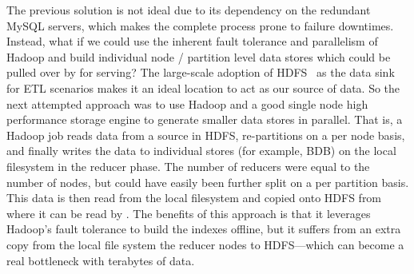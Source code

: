 The previous solution is not ideal due to its dependency on the
redundant MySQL servers, which makes the complete process prone to
failure downtimes. Instead, what if we could use the inherent fault
tolerance and parallelism of Hadoop and build individual node /
partition level data stores which could be pulled over by
\projectname{} for serving? The large-scale adoption of HDFS~\cite{hdfs}
 as the data sink for ETL scenarios makes it an ideal location to 
act as our source of data.
So the next attempted approach was to use Hadoop and a good single
node high performance storage engine to generate smaller data
stores in parallel. That is, a Hadoop job reads data from a source in
HDFS, re-partitions on a per node basis, and finally writes the data
to individual stores (for example, BDB) on the local filesystem in the
reducer phase. The number of reducers were equal to the number of
nodes, but could have easily been further split on a per partition
basis. This data is then read from the local filesystem and copied
onto HDFS from where it can be read by \projectname{}. The benefits of
this approach is that it leverages Hadoop's fault tolerance to build
the indexes offline, but it suffers from an extra copy from the local
file system the reducer nodes to HDFS---which can become a real
bottleneck with terabytes of data. 

